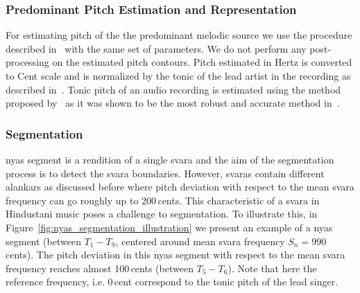 {\subsubsection{Predominant Pitch Estimation and Representation}

For estimating pitch of the the predominant melodic source we use the procedure described in~ with the same set of parameters. We do not perform any post-processing on the estimated pitch contours. Pitch estimated in Hertz is converted to Cent scale and is normalized by the tonic of the lead artist in the recording as described in~. Tonic pitch of an audio recording is estimated using the method proposed by~\cite{salamon2012multipitch} as it was shown to be the most robust and accurate method in~. 


\subsubsection{Segmentation}
\label{sec:nyas_svara_segmentation_method}

\Gls{nyas} segment is a rendition of a single \gls{svara} and the aim of the segmentation process is to detect the \gls{svara} boundaries. However, \glspl{svara} contain different \glspl{alankar} as discussed before where pitch deviation with respect to the mean \gls{svara} frequency can go roughly up to 200\,cents. This characteristic of a \gls{svara} in Hindustani music poses a challenge to segmentation. To illustrate this, in Figure~\ref{fig:nyas_segmentation_illustration} we present an example of a \gls{nyas} segment (between $T_1-T_9$, centered around mean \gls{svara} frequency $S_n=990$\,cents). The pitch deviation in this \gls{nyas} segment with respect to the mean \gls{svara} frequency reaches almost 100\,cents (between $T_5-T_6$). Note that here the reference frequency, i.e. 0\,cent correspond to the tonic pitch of the lead singer.

}
